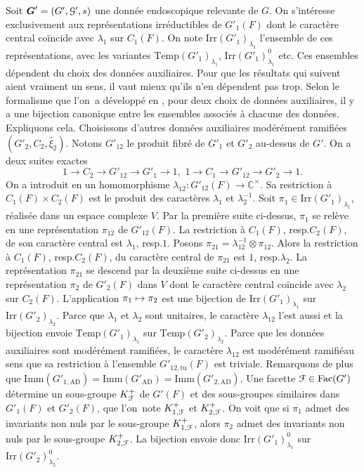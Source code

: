 \documentclass[11pt]{article}
\newcommand{\resp}{resp.\xspace}
\numberwithin{equation}{section}\providecommand{\og}{«\,}\providecommand{\fg}{\,»}
\let\mathcal \EuScript
\newcommand\mto{\mathchoice{\longmapsto}{\mapsto}{\mapsto}{\mapsto}}
\newcommand{\AD}{\mathrm{AD}}
\newcommand{\Fac}{\mathrm{Fac}}
\newcommand{\Imm}{\mathrm{Imm}}
\newcommand{\Irr}{\mathrm{Irr}}
\newcommand{\Temp}{\mathrm{Temp}}
\newcommand{\tu}{\mathrm{tu}}
\newcommand{\bG}{\boldsymbol{G}}
\newcommand{\cF}{\mathcal{F}}
\newcommand{\cG}{\mathcal{G}}
\newcommand{\CC}{\mathbb{C}}
\theoremstyle{plain}
\theoremstyle{definition}
\begin{document}
Soit $\bG'=(G',\cG',s)$ une donnée endoscopique relevante de $G$. On s'intéresse exclusivement aux représentations irréductibles de $G'_{1}(F)$ dont le caractère central coïncide avec $\lambda_{1}$ sur $C_{1}(F)$. On note $\Irr(G'_{1})_{\lambda_{1}}$ l'ensemble de ces représentations, avec les variantes $\Temp(G'_{1})_{\lambda_{1}}$, $\Irr(G'_{1})^0_{\lambda_{1}}$ etc. Ces ensembles dépendent du choix des données auxiliaires. Pour que les résultats qui suivent aient vraiment un sens, il vaut mieux qu'ils n'en dépendent pas trop. Selon le formalisme que l'on~a développé en \cite{MW}, pour deux choix de données auxiliaires, il y a une bijection canonique entre les ensembles associés à chacune des données. Expliquons cela.
Choisissons d'autres données auxiliaires modérément ramifiées $(G'_{2},C_{2},\hat{\xi}_{2})$. Notons $G'_{12}$ le produit fibré de $G'_{1}$ et $G'_{2}$ au-dessus de $G'$. On a deux suites exactes
\[
1\to C_{2}\to G'_{12}\to G'_{1}\to 1,\,\,1\to C_{1}\to G'_{12}\to G'_{2}\to 1.
\]
On a introduit en \cite[I.2.5]{MW} un homomorphisme $\lambda_{12}:G'_{12}(F)\to \CC^{\times}$. Sa restriction à $C_{1}(F)\times C_{2}(F)$ est le produit des caractères $\lambda_{1}$ et $\lambda_{2}^{-1}$. Soit $\pi_{1}\in \Irr(G'_{1})_{\lambda_{1}}$, réalisée dans un espace complexe $V$. Par la première suite ci-dessus, $\pi_{1}$ se relève en une représentation $\pi_{12}$ de $G'_{12}(F)$. La restriction à $C_{1}(F)$, \resp $C_{2}(F)$, de son carac\-tère central est $\lambda_{1}$, \resp $1$. Posons $\pi_{21}=\lambda_{12}^{-1}\otimes \pi_{12}$. Alors la restriction à $C_{1}(F)$, \resp $C_{2}(F)$, du caractère central de $\pi_{21}$ est $1$, \resp $\lambda_{2}$. La représentation $\pi_{21}$ se descend par la deuxième suite ci-dessus en une représentation $\pi_{2}$ de $G'_{2}(F)$ dans $V$ dont le caractère central coïncide avec $\lambda_{2}$ sur $C_{2}(F)$. L'application $\pi_{1}\mto \pi_{2}$ est une bijection de $\Irr(G'_{1})_{\lambda_{1}}$ sur $\Irr(G'_{2})_{\lambda_{2}}$. Parce que $\lambda_{1}$ et $\lambda_{2}$ sont unitaires, le caractère $\lambda_{12}$ l'est aussi et la bijection envoie $\Temp(G'_{1})_{\lambda_{1}}$ sur $\Temp(G'_{2})_{\lambda_{2}}$. Parce que les données auxiliaires sont modérément ramifiées, le caractère $\lambda_{12}$ est \og modérément ramifié\fg au sens que sa restriction à l'ensemble $G'_{12,\tu}(F)$ est triviale. Remarquons de plus que $\Imm(G'_{1,\AD})=\Imm(G'_{\AD})=\Imm(G'_{2,\AD})$. Une facette $\cF\in \Fac(G')$ détermine un sous-groupe $K_{\cF}^+$ de $G'(F)$ et des sous-groupes similaires dans $G'_{1}(F)$ et $G'_{2}(F)$, que l'on~note $K_{1,\cF}^+$ et $K_{2,\cF}^+$. On voit que si $\pi_{1}$ admet des invariants non nuls par le sous-groupe $K_{1,\cF}^{+}$, alors $\pi_{2}$ admet des invariants non nuls par le sous-groupe $K_{2,\cF}^{+}$. La bijection envoie donc $\Irr(G'_{1})^0_{\lambda_{1}}$ sur $\Irr(G'_{2})^0_{\lambda_{2}}$.
\end{document}
